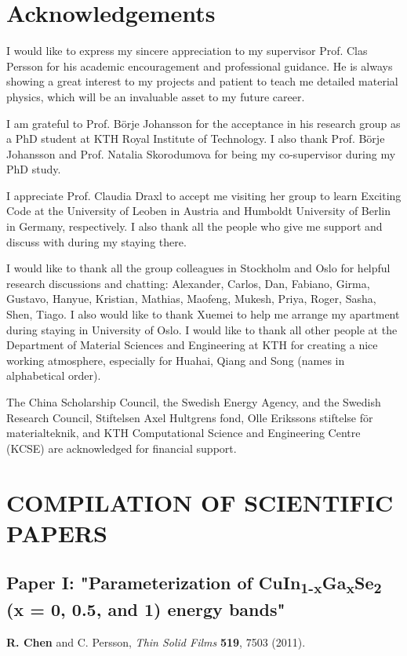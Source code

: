 \documentclass[a4paper, 12pt, titlepage,oneside,drop]{kthesis}
\begin{document}
\chapter*{Acknowledgements} 

I would like to express my sincere appreciation to my supervisor Prof. Clas Persson for his academic encouragement and professional guidance. He is always showing a great interest to my projects and patient to teach me detailed
material physics, which will be an invaluable asset to my future career.

I am grateful to Prof. Börje Johansson for the acceptance in his research group as a PhD student at KTH Royal Institute of Technology. I also thank Prof. Börje Johansson and Prof. Natalia Skorodumova for being my co-supervisor during my PhD study.

I appreciate Prof. Claudia Draxl to accept me visiting her group to learn Exciting Code at the University of Leoben in Austria and Humboldt University of Berlin in Germany, respectively. I also thank all the people who give me support and
discuss with during my staying there.

I would like to thank all the group colleagues in Stockholm and Oslo for helpful research discussions and chatting: Alexander, Carlos, Dan, Fabiano, Girma, Gustavo, Hanyue, Kristian, Mathias, Maofeng, Mukesh, Priya, Roger, Sasha, Shen, Tiago.
I also would like to thank Xuemei to help me arrange my apartment during staying in University of Oslo. I would like to thank all other people at the Department of Material Sciences and Engineering at KTH for creating a nice working atmosphere,
especially for Huahai, Qiang and Song (names in alphabetical order).

The China Scholarship Council, the Swedish Energy Agency, and the Swedish Research Council, Stiftelsen Axel Hultgrens fond,  Olle Erikssons stiftelse för materialteknik, and KTH Computational Science and Engineering Centre (KCSE) 
are acknowledged for financial support.







\chapter{COMPILATION OF SCIENTIFIC PAPERS}

\section{Paper I: "Parameterization of CuIn\textsubscript{1-x}Ga\textsubscript{x}Se\textsubscript{2} (x = 0, 0.5, and 1) energy bands"}
\textbf{R. Chen} and C. Persson, \textit{Thin Solid Films} {\textbf {519}}, 7503 (2011).
\end{document}
